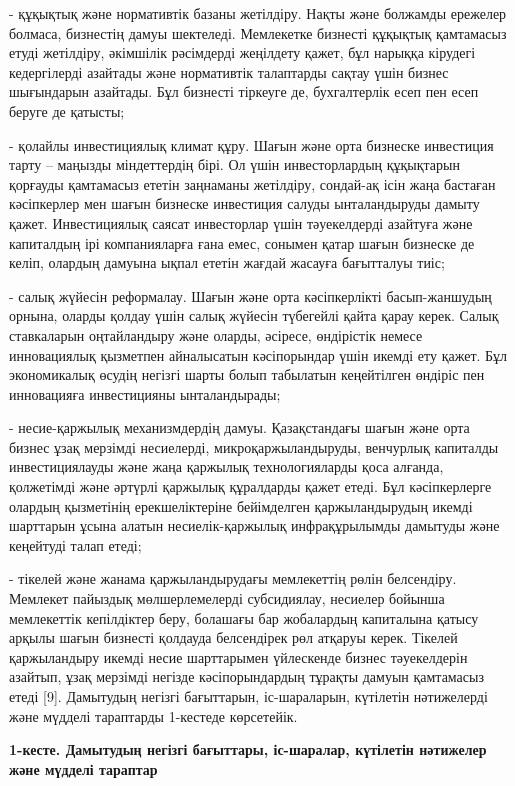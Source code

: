 \begin{multicols}{2}
- құқықтық және нормативтік базаны жетілдіру. Нақты және болжамды
ережелер болмаса, бизнестің дамуы шектеледі. Мемлекетке бизнесті
құқықтық қамтамасыз етуді жетілдіру, әкімшілік рәсімдерді жеңілдету
қажет, бұл нарыққа кірудегі кедергілерді азайтады және нормативтік
талаптарды сақтау үшін бизнес шығындарын азайтады. Бұл бизнесті тіркеуге
де, бухгалтерлік есеп пен есеп беруге де қатысты;

- қолайлы инвестициялық климат құру. Шағын және орта бизнеске инвестиция
тарту -- маңызды міндеттердің бірі. Ол үшін инвесторлардың құқықтарын
қорғауды қамтамасыз ететін заңнаманы жетілдіру, сондай-ақ ісін жаңа
бастаған кәсіпкерлер мен шағын бизнеске инвестиция салуды ынталандыруды
дамыту қажет. Инвестициялық саясат инвесторлар үшін тәуекелдерді
азайтуға және капиталдың ірі компанияларға ғана емес, сонымен қатар
шағын бизнеске де келіп, олардың дамуына ықпал ететін жағдай жасауға
бағытталуы тиіс;

- салық жүйесін реформалау. Шағын және орта кәсіпкерлікті басып-жаншудың
орнына, оларды қолдау үшін салық жүйесін түбегейлі қайта қарау керек.
Салық ставкаларын оңтайландыру және оларды, әсіресе, өндірістік немесе
инновациялық қызметпен айналысатын кәсіпорындар үшін икемді ету қажет.
Бұл экономикалық өсудің негізгі шарты болып табылатын кеңейтілген
өндіріс пен инновацияға инвестицияны ынталандырады;

- несие-қаржылық механизмдердің дамуы. Қазақстандағы шағын және орта
бизнес ұзақ мерзімді несиелерді, микроқаржыландыруды, венчурлық
капиталды инвестициялауды және жаңа қаржылық технологияларды қоса
алғанда, қолжетімді және әртүрлі қаржылық құралдарды қажет етеді. Бұл
кәсіпкерлерге олардың қызметінің ерекшеліктеріне бейімделген
қаржыландырудың икемді шарттарын ұсына алатын несиелік-қаржылық
инфрақұрылымды дамытуды және кеңейтуді талап етеді;

- тікелей және жанама қаржыландырудағы мемлекеттің рөлін белсендіру.
Мемлекет пайыздық мөлшерлемелерді субсидиялау, несиелер бойынша
мемлекеттік кепілдіктер беру, болашағы бар жобалардың капиталына қатысу
арқылы шағын бизнесті қолдауда белсендірек рөл атқаруы керек. Тікелей
қаржыландыру икемді несие шарттарымен үйлескенде бизнес тәуекелдерін
азайтып, ұзақ мерзімді негізде кәсіпорындардың тұрақты дамуын қамтамасыз
етеді {[}9{]}. Дамытудың негізгі бағыттарын, іс-шараларын, күтілетін
нәтижелерді және мүдделі тараптарды 1-кестеде көрсетейік.
\end{multicols}

\begin{center}
{\bfseries 1-кесте. Дамытудың негізгі бағыттары, іс-шаралар, күтілетін нәтижелер \\және мүдделі тараптар}
\end{center}

